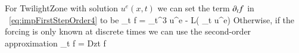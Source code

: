 For TwilightZone with solution $u^e(x,t)$ we can set the term $\partial_t f$ in ~\eqref{eq:impFirstStepOrder4} to be 
\ba
 \p_t f = \p_t^3 u^e - L( \p_t u^e) 
\ea
Otherwise, if the forcing is only known at discrete times we can use the second-order approximation
\ba
   \p_t f = Dzt f 
\ea









